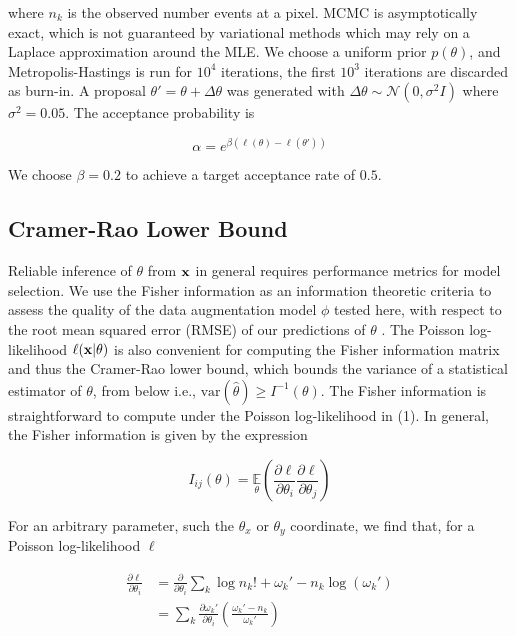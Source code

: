 \documentclass{article}
\begin{document}
where $n_{k}$ is the observed number events at a pixel. MCMC is asymptotically exact, which is not guaranteed by variational methods which may rely on a Laplace approximation around the MLE. We choose a uniform prior $p(\theta)$, and Metropolis-Hastings is run for $10^4$ iterations, the first $10^{3}$ iterations are discarded as burn-in. A proposal $\theta' = \theta + \Delta\theta$ was generated with $\Delta\theta \sim \mathcal{N}(0,\sigma^{2}I)$ where $\sigma^{2}=0.05$. The acceptance probability is

\begin{equation*}
\alpha = e^{\beta(\ell(\theta)-\ell(\theta'))}
\end{equation*}

We choose $\beta=0.2$ to achieve a target acceptance rate of $0.5$.

\subsection{Cramer-Rao Lower Bound}

Reliable inference of $\theta$ from $\bold{x}$ in general requires performance metrics for model selection. We use the Fisher information as an information theoretic criteria to assess the quality of the data augmentation model $\phi$ tested here, with respect to the root mean squared error (RMSE) of our predictions of $\theta$ \citep{Chao2016}. The Poisson log-likelihood $\ell(\bold{x}|\theta)$ is also convenient for computing the Fisher information matrix \citep{Smith2010} and thus the Cramer-Rao lower bound, which bounds the variance of a statistical estimator of $\theta$, from below i.e., $\mathrm{var}(\hat{\theta}) \geq I^{-1}(\theta)$. The Fisher information is straightforward to compute under the Poisson log-likelihood in (1). In general, the Fisher information is given by the expression

\begin{equation}
I_{ij}(\theta) = \underset{\theta}{\mathbb{E}}\left(\frac{\partial \ell}{\partial\theta_{i}}\frac{\partial\ell}{\partial\theta_{j}}\right) 
\end{equation}

For an arbitrary parameter, such the $\theta_{x}$ or $\theta_{y}$ coordinate, we find that, for a Poisson log-likelihood $\ell$

\begin{align*}
\frac{\partial \ell}{\partial \theta_{i}} &= \frac{\partial}{\partial \theta_{i}} \sum_{k}  \log n_{k}! + \omega_{k}' - n_{k}\log\left(\omega_{k}'\right)\\
&= \sum_{k} \frac{\partial \omega_{k}'}{\partial\theta_{i}} \left(\frac{\omega_{k}'-n_{k}}{\omega_{k}'}\right)
\end{align*}
\end{document}
